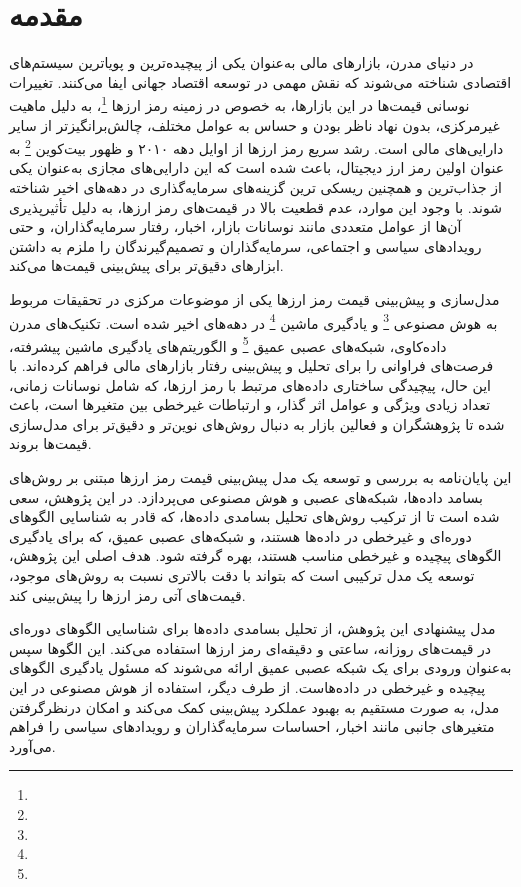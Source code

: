 \chapter*{مقدمه}
در دنیای مدرن، بازارهای مالی به‌عنوان یکی از پیچیده‌ترین و پویا‌ترین سیستم‌های اقتصادی شناخته می‌شوند که نقش مهمی در توسعه اقتصاد جهانی ایفا می‌کنند. تغییرات نوسانی قیمت‌ها در این بازارها، به خصوص در زمینه رمز ارزها \footnote{}، به دلیل ماهیت غیرمرکزی، بدون نهاد ناظر بودن و حساس به عوامل مختلف، چالش‌برانگیزتر از سایر دارایی‌های مالی است. رشد سریع رمز ارزها از اوایل دهه ۲۰۱۰ و ظهور بیت‌کوین \footnote{}  به عنوان اولین رمز ارز دیجیتال، باعث شده است که این دارایی‌های مجازی به‌عنوان یکی از جذاب‌ترین و همچنین ریسکی ترین گزینه‌های سرمایه‌گذاری در دهه‌های اخیر شناخته شوند. با وجود این موارد، عدم قطعیت بالا در قیمت‌های رمز ارزها، به دلیل تأثیرپذیری آن‌ها از عوامل متعددی مانند نوسانات بازار، اخبار، رفتار سرمایه‌گذاران، و حتی رویدادهای سیاسی و اجتماعی، سرمایه‌گذاران و تصمیم‌گیرندگان را ملزم به داشتن ابزارهای دقیق‌تر برای پیش‌بینی قیمت‌ها می‌کند.


مدل‌سازی و پیش‌بینی قیمت رمز ارزها یکی از موضوعات مرکزی در تحقیقات مربوط به هوش مصنوعی \footnote{} و یادگیری ماشین \footnote{} در دهه‌های اخیر شده است. تکنیک‌های مدرن داده‌کاوی، شبکه‌های عصبی عمیق \footnote{} و الگوریتم‌های یادگیری ماشین پیشرفته، فرصت‌های فراوانی را برای تحلیل و پیش‌بینی رفتار بازارهای مالی فراهم کرده‌اند. با این حال، پیچیدگی ساختاری داده‌های مرتبط با رمز ارزها، که شامل نوسانات زمانی، تعداد زیادی ویژگی و عوامل اثر گذار، و ارتباطات غیرخطی بین متغیرها است، باعث شده تا پژوهشگران و فعالین بازار به دنبال روش‌های نوین‌تر و دقیق‌تر برای مدل‌سازی قیمت‌ها بروند.


این پایان‌نامه به بررسی و توسعه یک مدل پیش‌بینی قیمت رمز ارزها مبتنی بر روش‌های بسامد داده‌ها، شبکه‌های عصبی و هوش مصنوعی می‌پردازد. در این پژوهش، سعی شده است تا از ترکیب روش‌های تحلیل بسامدی داده‌ها، که قادر به شناسایی الگوهای دوره‌ای و غیرخطی در داده‌ها هستند، و شبکه‌های عصبی عمیق، که برای یادگیری الگوهای پیچیده و غیرخطی مناسب هستند، بهره گرفته شود. هدف اصلی این پژوهش، توسعه یک مدل ترکیبی است که بتواند با دقت بالاتری نسبت به روش‌های موجود، قیمت‌های آتی رمز ارزها را پیش‌بینی کند.

مدل پیشنهادی این پژوهش، از تحلیل بسامدی داده‌ها برای شناسایی الگوهای دوره‌ای در قیمت‌های روزانه، ساعتی و دقیقه‌ای رمز ارزها استفاده می‌کند. این الگوها سپس به‌عنوان ورودی برای یک شبکه عصبی عمیق ارائه می‌شوند که مسئول یادگیری الگوهای پیچیده و غیرخطی در داده‌هاست. از طرف دیگر، استفاده از هوش مصنوعی در این مدل، به صورت مستقیم به بهبود عملکرد پیش‌بینی کمک می‌کند و امکان درنظرگرفتن متغیرهای جانبی مانند اخبار، احساسات سرمایه‌گذاران و رویدادهای سیاسی را فراهم می‌آورد.

